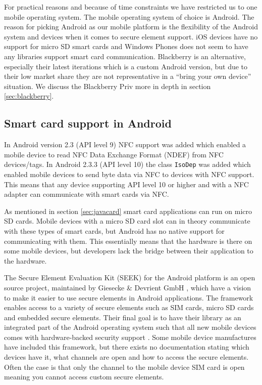 For practical reasons and because of time constraints we have restricted us to one mobile operating system. The mobile operating system of choice is Android. The reason for picking Android as our mobile platform is the flexibility of the Android system and devices when it comes to secure element support. iOS devices have no support for micro SD smart cards and Windows Phones does not seem to have any libraries support smart card communication. Blackberry is an alternative, especially their latest iterations which is a custom Android version, but due to their low market share they are not representative in a ``bring your own device'' situation. We discuss the Blackberry Priv more in depth in section \ref{sec:blackberry}.


\subsection{Smart card support in Android}
\label{sec:supportAndroid}
In Android version 2.3 (API level 9) NFC support was added which enabled a mobile device to read NFC Data Exchange Format (NDEF) from NFC devices/tags. In Android 2.3.3 (API level 10) the class \texttt{IsoDep} was added which enabled mobile devices to send byte data via NFC to devices with NFC support. This means that any device supporting API level 10 or higher and with a NFC adapter can communicate with smart cards via NFC.

As mentioned in section \ref{sec:javacard} smart card applications can run on micro SD cards. Mobile devices with a micro SD card slot can in theory communicate with these types of smart cards, but Android has no native support for communicating with them. This essentially means that the hardware is there on some mobile devices, but developers lack the bridge between their application to the hardware.

The Secure Element Evaluation Kit (SEEK) for the Android platform is an open source project, maintained by Giesecke \& Devrient GmbH \cite{Giesecke}, which have a vision to make it easier to use secure elements in Android applications. The framework enables access to a variety of secure elements such as SIM cards, micro SD cards and embedded secure elements. Their final goal is to have their library as an integrated part of the Android operating system such that all new mobile devices comes with hardware-backed security support \cite{SEEK}. Some mobile device manufactures have included this framework, but there exists no documentation stating which devices have it, what channels are open and how to access the secure elements. Often the case is that only the channel to the mobile device SIM card is open meaning you cannot access custom secure elements.

